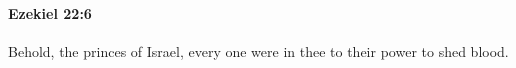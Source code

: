 
		\paragraph{Ezekiel 22:6} %
			\label{EZEKIEL-22-6}

			Behold, the princes of Israel, every one were in thee to their power to shed blood.


